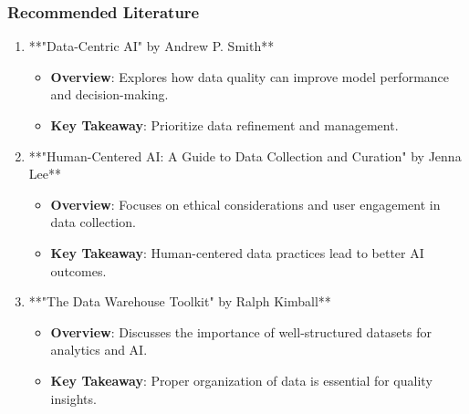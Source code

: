\documentclass[aspectratio=169]{beamer}
\begin{document}
\begin{frame}[fragile]
    \frametitle{Recommended Literature}
    \begin{enumerate}
        \item **"Data-Centric AI" by Andrew P. Smith**
            \begin{itemize}
                \item \textbf{Overview}: Explores how data quality can improve model performance and decision-making.
                \item \textbf{Key Takeaway}: Prioritize data refinement and management.
            \end{itemize}
        \item **"Human-Centered AI: A Guide to Data Collection and Curation" by Jenna Lee**
            \begin{itemize}
                \item \textbf{Overview}: Focuses on ethical considerations and user engagement in data collection.
                \item \textbf{Key Takeaway}: Human-centered data practices lead to better AI outcomes.
            \end{itemize}
        \item **"The Data Warehouse Toolkit" by Ralph Kimball**
            \begin{itemize}
                \item \textbf{Overview}: Discusses the importance of well-structured datasets for analytics and AI.
                \item \textbf{Key Takeaway}: Proper organization of data is essential for quality insights.
            \end{itemize}
    \end{enumerate}
\end{frame}
\end{document}
